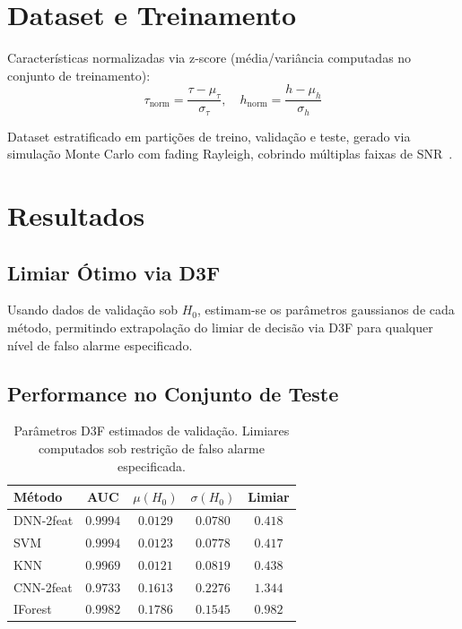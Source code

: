 \documentclass{sbrt}
\begin{document}
\section{Dataset e Treinamento}

Características normalizadas via z-score (média/variância computadas no conjunto de treinamento):
$$\tau_{\mathrm{norm}} = \frac{\tau - \mu_\tau}{\sigma_\tau}, \quad h_{\mathrm{norm}} = \frac{h - \mu_h}{\sigma_h}$$

Dataset estratificado em partições de treino, validação e teste, gerado via simulação Monte Carlo com fading Rayleigh, cobrindo múltiplas faixas de SNR~\cite{ref_joao}.

\section{Resultados}

\subsection{Limiar Ótimo via D3F}

Usando dados de validação sob $H_0$, estimam-se os parâmetros gaussianos de cada método, permitindo extrapolação do limiar de decisão via D3F para qualquer nível de falso alarme especificado.

\subsection{Performance no Conjunto de Teste}

\begin{table}[H]
\centering
\begin{tabular}{lcccc}
\toprule
\textbf{Método} & \textbf{AUC} & \textbf{$\mu(H_0)$} & \textbf{$\sigma(H_0)$} & \textbf{Limiar} \\
\midrule
DNN-2feat & $0.9994$ & $0.0129$ & $0.0780$ & $0.418$ \\
SVM & $0.9994$ & $0.0123$ & $0.0778$ & $0.417$ \\
KNN & $0.9969$ & $0.0121$ & $0.0819$ & $0.438$ \\
CNN-2feat & $0.9733$ & $0.1613$ & $0.2276$ & $1.344$ \\
IForest & $0.9982$ & $0.1786$ & $0.1545$ & $0.982$ \\
\bottomrule
\end{tabular}
\caption{Parâmetros D3F estimados de validação. Limiares computados sob restrição de falso alarme especificada.}
\label{tab:d3f_params}
\end{table}
\end{document}
